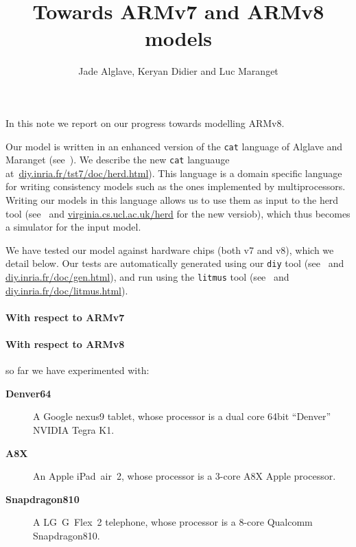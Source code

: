 \documentclass[a4paper]{article}
\begin{document}
\title{Towards ARMv7 and ARMv8 models}
\author{Jade Alglave, Keryan Didier and Luc Maranget}
\maketitle
\let\prog\textsf

In this note we report on our progress towards modelling ARMv8.


Our model is written in an enhanced
version of the {\tt cat} language of Alglave and Maranget
(see~\cite{amt14}).
We describe the new \texttt{cat} languauge
at~\url{diy.inria.fr/tst7/doc/herd.html}).  
This language is a domain specific language for writing
consistency models such as the ones implemented by multiprocessors. Writing our
models in this language allows us to use them as input to the {\sf herd} tool
(see~\cite{amt14} and
\url{virginia.cs.ucl.ac.uk/herd} for the new versiob),
which thus becomes a simulator for the input
model.

We have tested our model against hardware chips (both v7 and v8), which we
detail below.  Our tests are automatically generated using our {\tt diy} tool
(see~\cite{alg10,ams10,ams12,amt14} and \url{diy.inria.fr/doc/gen.html}), and
run using the {\tt litmus} tool (see~\cite{ams11} and
\url{diy.inria.fr/doc/litmus.html}).

\paragraph{With respect to ARMv7} 

\paragraph{With respect to ARMv8 $\!\!\!\!\!\!$} so far we have
experimented with:
\begin{description}
\item[\textbf{Denver64}]
A Google nexus9 tablet, whose processor is a dual core 64bit
``Denver'' NVIDIA Tegra K1.

\item[\textbf{A8X}]
An Apple iPad~air~2, whose processor is a 3-core
A8X Apple processor.

\item[\textbf{Snapdragon810}]
A LG~G~Flex~2 telephone, whose processor is a 8-core Qualcomm
Snapdragon810.
\end{description}
\end{document}
